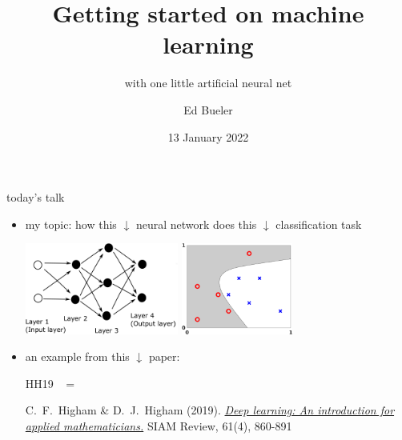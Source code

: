 \documentclass[xcolor={svgnames},
               hyperref={colorlinks,citecolor=DeepPink4,linkcolor=FireBrick,urlcolor=Maroon}]
               {beamer}
\title{Getting started on machine learning}
\subtitle{{with one little artificial neural net}}
\author{Ed Bueler}
\institute[UAF]{MATH 692 Mathematics for Machine Learning \\ UAF}
\date[Spring 2022]{13 January 2022}
\begin{document}
\beamertemplatenavigationsymbolsempty

\begin{frame}
  \maketitle
\end{frame}

\begin{frame}{today's talk}

\begin{itemize}
\item \alert{my topic:} {\small how this $\downarrow$ neural network does this $\downarrow$ classification task}

\medskip
\hspace{5mm} \includegraphics[height=30mm]{figs/network.png} \hfill \includegraphics[height=30mm]{figs/classification} \hspace{10mm}

\bigskip
\item an \alert{example} from this $\downarrow$ paper:

\medskip

HH19 \, $=$ \, 
\begin{minipage}[t]{0.75\textwidth} \footnotesize
C.~F.~Higham \& D.~J.~Higham (2019). \href{http://www.math.stonybrook.edu/~bishop/classes/math533.S21/MachineLearning/SIAMreview.pdf}{\emph{Deep learning: An introduction for applied mathematicians.}} SIAM Review, 61(4), 860-891
\end{minipage}
\end{itemize}
\end{frame}
\end{document}
